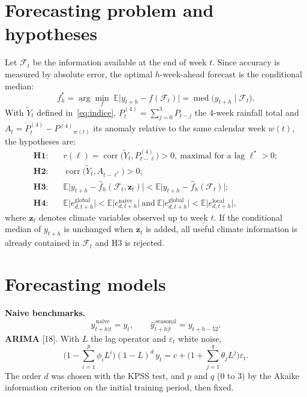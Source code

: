 \documentclass[11pt]{article}
\begin{document}
\section{Forecasting problem and hypotheses}\label{sec:hyp}
Let $\mathcal{F}_t$ be the information available at the end of week $t$. Since accuracy is measured by absolute error, the optimal $h$-week-ahead forecast is the conditional median:
\begin{equation}
f_h^{*}=\arg\min_f\;\mathbb{E}\big|y_{t+h}-f(\mathcal{F}_t)\big|=\operatorname{med}\big(y_{t+h}\mid\mathcal{F}_t\big).
\label{eq:objectif}
\end{equation}
With $\tilde{Y}_t$ defined in~\eqref{eq:indice}, $P^{(4)}_t=\sum_{j=0}^{3}P_{t-j}$ the 4-week rainfall total and $A_t=P^{(4)}_t-\overline{P^{(4)}}_{w(t)}$ its anomaly relative to the same calendar week $w(t)$, the hypotheses are:
\begin{align}
\textbf{H1:}&\quad r(\ell)=\operatorname{corr}\big(\tilde{Y}_t,P^{(4)}_{t-\ell}\big)>0,\ \text{maximal for a lag }\ell^{*}>0 ; \label{eq:h1}\\
\textbf{H2:}&\quad \operatorname{corr}\big(\tilde{Y}_t,A_{t-\ell^{*}}\big)>0 ; \label{eq:h2}\\
\textbf{H3:}&\quad \mathbb{E}\big|y_{t+h}-\hat{f}_h(\mathcal{F}_t,\mathbf{z}_t)\big|<\mathbb{E}\big|y_{t+h}-\hat{f}_h(\mathcal{F}_t)\big| ; \label{eq:h3}\\
\textbf{H4:}&\quad \mathbb{E}\big|e^{\text{global}}_{d,t+h}\big|<\mathbb{E}\big|e^{\text{naive}}_{d,t+h}\big|\ \text{and}\ \mathbb{E}\big|e^{\text{global}}_{d,t+h}\big|<\mathbb{E}\big|e^{\text{local}}_{d,t+h}\big| , \label{eq:h4}
\end{align}
where $\mathbf{z}_t$ denotes climate variables observed up to week $t$. If the conditional median of $y_{t+h}$ is unchanged when $\mathbf{z}_t$ is added, all useful climate information is already contained in $\mathcal{F}_t$ and H3 is rejected.

\section{Forecasting models}
\textbf{Naive benchmarks.}
\begin{equation}
\hat{y}^{\,\text{naive}}_{t+h|t}=y_t,\qquad \hat{y}^{\,\text{seasonal}}_{t+h|t}=y_{t+h-52}.
\label{eq:naif}
\end{equation}
\textbf{ARIMA} [18]. With $L$ the lag operator and $\varepsilon_t$ white noise,
\begin{equation}
\Big(1-\sum_{i=1}^{p}\phi_iL^{i}\Big)(1-L)^{d}\,y_t=c+\Big(1+\sum_{j=1}^{q}\theta_jL^{j}\Big)\varepsilon_t .
\label{eq:arima}
\end{equation}
The order $d$ was chosen with the KPSS test, and $p$ and $q$ (0 to 3) by the Akaike information criterion on the initial training period, then fixed.
\end{document}
